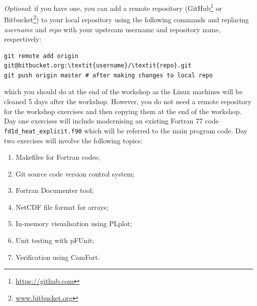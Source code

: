 \documentclass[12pt]{article}
\begin{document}
{\em Optional}: if you have one, you can add a remote repository (GitHub\footnote{\url{https://github.com}}
or Bitbucket\footnote{\url{www.bitbucket.org}}) to your local repository
using the following commands and replacing \textit{username} and \textit{repo} with your upstream username
and repository name, respectively:
\begin{Verbatim}[commandchars=\\\{\}]
git remote add origin git@bitbucket.org:\textit{username}/\textit{repo}.git
git push origin master # after making changes to local repo
\end{Verbatim}
which you should do at the end of the workshop as the Linux machines will be cleaned 5 days after the workshop.
However, you do not need a remote repository for the workshop exercises and
then copying them at the end of the workshop.
Day one exercises will include modernising an existing Fortran 77 code \texttt{fd1d\_heat\_explicit.f90} which
will be referred to the main program code. Day two exercises will involve the following topics:
\begin{enumerate}
\item Makefiles for Fortran codes;
\item Git source code version control system;
\item Fortran Documenter tool;
\item NetCDF file format for arrays;
\item In-memory visualisation using PLplot;
\item Unit testing with pFUnit;
\item Verification using CamFort.
\end{enumerate}
\newpage
\end{document}
